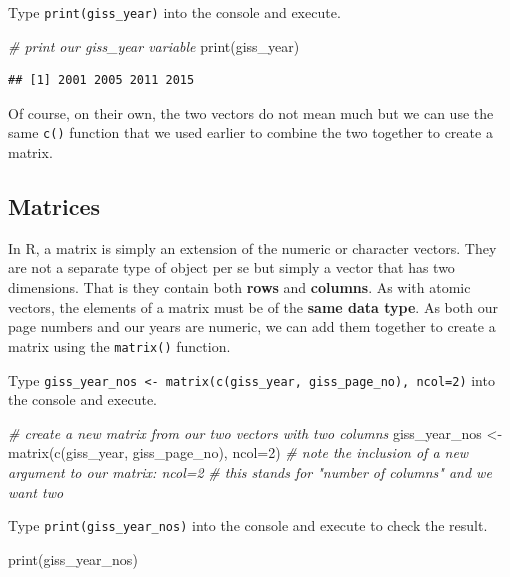 \documentclass[
]{book}
\newenvironment{Shaded}{\begin{snugshade}}{\end{snugshade}}
\newcommand{\AttributeTok}[1]{\textcolor[rgb]{0.77,0.63,0.00}{#1}}
\newcommand{\CommentTok}[1]{\textcolor[rgb]{0.56,0.35,0.01}{\textit{#1}}}
\newcommand{\DecValTok}[1]{\textcolor[rgb]{0.00,0.00,0.81}{#1}}
\newcommand{\FunctionTok}[1]{\textcolor[rgb]{0.00,0.00,0.00}{#1}}
\newcommand{\NormalTok}[1]{#1}
\newcommand{\OtherTok}[1]{\textcolor[rgb]{0.56,0.35,0.01}{#1}}
\begin{document}
Type \texttt{print(giss\_year)} into the console and execute.

\begin{Shaded}
\begin{Highlighting}[]
\CommentTok{\# print our giss\_year variable}
\FunctionTok{print}\NormalTok{(giss\_year)}
\end{Highlighting}
\end{Shaded}

\begin{verbatim}
## [1] 2001 2005 2011 2015
\end{verbatim}

Of course, on their own, the two vectors do not mean much but we can use the same \texttt{c()} function that we used earlier to combine the two together to create a matrix.

\hypertarget{matrices}{%
\subsection{Matrices}\label{matrices}}

In R, a matrix is simply an extension of the numeric or character vectors. They are not a separate type of object per se but simply a vector that has two dimensions. That is they contain both \textbf{rows} and \textbf{columns}. As with atomic vectors, the elements of a matrix must be of the \textbf{same data type}. As both our page numbers and our years are numeric, we can add them together to create a matrix using the \texttt{matrix()} function.

Type \texttt{giss\_year\_nos\ \textless{}-\ matrix(c(giss\_year,\ giss\_page\_no),\ ncol=2)} into the console and execute.

\begin{Shaded}
\begin{Highlighting}[]
\CommentTok{\# create a new matrix from our two vectors with two columns}
\NormalTok{giss\_year\_nos }\OtherTok{\textless{}{-}} \FunctionTok{matrix}\NormalTok{(}\FunctionTok{c}\NormalTok{(giss\_year, giss\_page\_no), }\AttributeTok{ncol=}\DecValTok{2}\NormalTok{)}
\CommentTok{\# note the inclusion of a new argument to our matrix: ncol=2}
\CommentTok{\# this stands for "number of columns" and we want two}
\end{Highlighting}
\end{Shaded}

Type \texttt{print(giss\_year\_nos)} into the console and execute to check the result.

\begin{Shaded}
\begin{Highlighting}[]
\FunctionTok{print}\NormalTok{(giss\_year\_nos)}
\end{Highlighting}
\end{Shaded}
\end{document}
